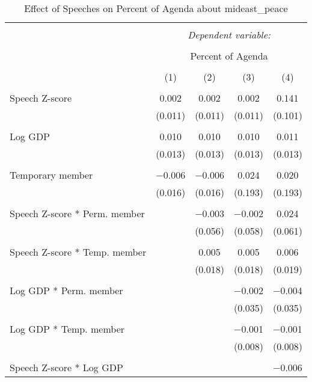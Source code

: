 
\begin{table}[!htbp] \centering 
  \caption{Effect of Speeches on Percent of Agenda about mideast_peace} 
  \label{} 
\begin{tabular}{@{\extracolsep{5pt}}lcccc} 
\\[-1.8ex]\hline 
\hline \\[-1.8ex] 
 & \multicolumn{4}{c}{\textit{Dependent variable:}} \\ 
\cline{2-5} 
\\[-1.8ex] & \multicolumn{4}{c}{Percent of Agenda} \\ 
\\[-1.8ex] & (1) & (2) & (3) & (4)\\ 
\hline \\[-1.8ex] 
 Speech Z-score & 0.002 & 0.002 & 0.002 & 0.141 \\ 
  & (0.011) & (0.011) & (0.011) & (0.101) \\ 
  & & & & \\ 
 Log GDP & 0.010 & 0.010 & 0.010 & 0.011 \\ 
  & (0.013) & (0.013) & (0.013) & (0.013) \\ 
  & & & & \\ 
 Temporary member & $-$0.006 & $-$0.006 & 0.024 & 0.020 \\ 
  & (0.016) & (0.016) & (0.193) & (0.193) \\ 
  & & & & \\ 
 Speech Z-score * Perm. member &  & $-$0.003 & $-$0.002 & 0.024 \\ 
  &  & (0.056) & (0.058) & (0.061) \\ 
  & & & & \\ 
 Speech Z-score * Temp. member &  & 0.005 & 0.005 & 0.006 \\ 
  &  & (0.018) & (0.018) & (0.019) \\ 
  & & & & \\ 
 Log GDP * Perm. member &  &  & $-$0.002 & $-$0.004 \\ 
  &  &  & (0.035) & (0.035) \\ 
  & & & & \\ 
 Log GDP * Temp. member &  &  & $-$0.001 & $-$0.001 \\ 
  &  &  & (0.008) & (0.008) \\ 
  & & & & \\ 
 Speech Z-score * Log GDP &  &  &  & $-$0.006 \\ 

\end{tabular}
\end{table}
